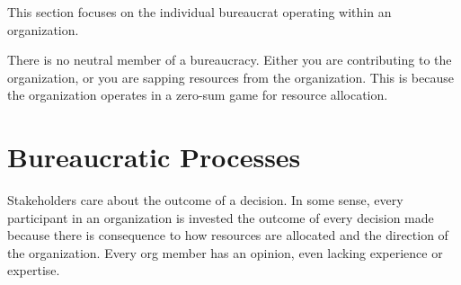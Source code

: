\documentclass{book}
\begin{document}
    This section focuses on the individual bureaucrat operating within an organization. 
    
    There is no neutral member of a bureaucracy. Either you are contributing to the organization, or you are sapping resources from the organization. This is because the organization operates in a zero-sum game for resource allocation.
    
    
    
    
  \newpage
    
    
    
    
    
  \newpage
  \section{Bureaucratic Processes\label{sec:process}}
    
    
    
    
    
    
    
    
    
  \newpage

    
    
    
    

    Stakeholders care about the outcome of a decision. 
    In some sense, every participant in an organization is invested the outcome of every decision made because there is consequence to how resources are allocated and the direction of the organization. Every org member has an opinion, even lacking experience or expertise. 
    
    
    
%    
%    
    
\end{document}
